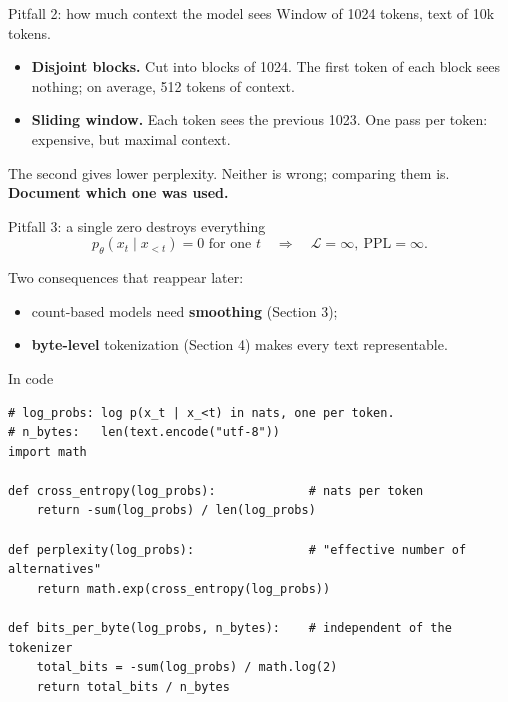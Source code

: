 \documentclass[11pt,aspectratio=169]{beamer}
\newcommand{\Lc}{\mathcal{L}}
\newcommand{\PPL}{\mathrm{PPL}}
\newcommand{\ptheta}{p_{\theta}}
\newcommand{\dest}[1]{\textcolor{structure}{\textbf{#1}}}
\begin{document}
\begin{frame}{Pitfall 2: how much context the model sees}
  Window of 1024 tokens, text of 10k tokens.

  \vspace{0.8em}
  \begin{itemize}
    \item \dest{Disjoint blocks.} Cut into blocks of 1024. The first token of each block
          sees nothing; on average, 512 tokens of context.
    \item \dest{Sliding window.} Each token sees the previous 1023. One pass per token:
          expensive, but maximal context.
  \end{itemize}

  \vspace{0.8em}
  The second gives lower perplexity. Neither is wrong; comparing them is.\\
  \textbf{Document which one was used.}
\end{frame}

\begin{frame}{Pitfall 3: a single zero destroys everything}
  \[
    \ptheta(x_t\mid x_{<t}) = 0 \text{ for one } t
    \quad\Longrightarrow\quad \Lc = \infty,\ \PPL = \infty .
  \]

  \vspace{1em}
  Two consequences that reappear later:
  \begin{itemize}
    \item count-based models need \dest{smoothing} (Section 3);
    \item \dest{byte-level} tokenization (Section 4) makes every text representable.
  \end{itemize}
\end{frame}

\begin{frame}[fragile]{In code}
\begin{lstlisting}[style=py]
# log_probs: log p(x_t | x_<t) in nats, one per token.
# n_bytes:   len(text.encode("utf-8"))
import math

def cross_entropy(log_probs):             # nats per token
    return -sum(log_probs) / len(log_probs)

def perplexity(log_probs):                # "effective number of alternatives"
    return math.exp(cross_entropy(log_probs))

def bits_per_byte(log_probs, n_bytes):    # independent of the tokenizer
    total_bits = -sum(log_probs) / math.log(2)
    return total_bits / n_bytes
\end{lstlisting}
\end{frame}
\end{document}
